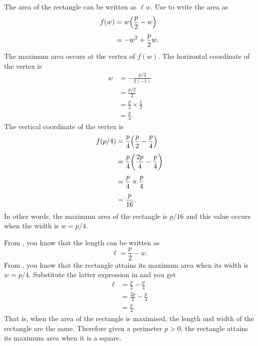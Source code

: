 \documentclass[a4paper,oneside,12pt]{article}
\begin{document}
\begin{problem}
{\begin{solution}
The area of the rectangle can be written as $\ell w$.
Use  to write the area as
\begin{align*}
f(w)
&=
w \parenthesis*{\frac{p}{2} - w} \\[4pt]
&=
-w^2 + \frac{p}{2}w.
\end{align*}
The maximum area occurs at the vertex of $f(w)$.  The horizontal
coordinate of the vertex is
\begin{align*}
w
&=
-\frac{p/2}{2(-1)} \\[4pt]
&=
\frac{p/2}{2} \\[4pt]
&=
\frac{p}{2} \times \frac{1}{2} \\[4pt]
&=
\frac{p}{4}.
\end{align*}
The vertical coordinate of the vertex is
\begin{align*}
f(p/4)
&=
\frac{p}{4}
\parenthesis*{
  \frac{p}{2} - \frac{p}{4}
} \\[4pt]
&=
\frac{p}{4}
\parenthesis*{
  \frac{2p}{4} - \frac{p}{4}
} \\[4pt]
&=
\frac{p}{4} \times \frac{p}{4} \\[4pt]
&=
\frac{p}{16}.
\end{align*}
In other words, the maximum area of the rectangle is $p / 16$ and this
value occurs when the width is $w = p / 4$.

From , you know that the length can
be written as
\begin{equation}
\label{eqn:rectangle_length_as_width_and_perimeter}
\ell
=
\frac{p}{2} - w.
\end{equation}
From , you know that the
rectangle attains its maximum area when its width is $w = p / 4$.
Substitute the latter expression in
 and you get
\begin{align*}
\ell
&=
\frac{p}{2} - \frac{p}{4} \\[4pt]
&=
\frac{2p}{4} - \frac{p}{4} \\[4pt]
&=
\frac{p}{4}.
\end{align*}
That is, when the area of the rectangle is maximised, the length and
width of the rectangle are the same.  Therefore given a perimeter
$p > 0$, the rectangle attains its maximum area when it is a square.
\end{solution}
}{}


\end{problem}
\end{document}
